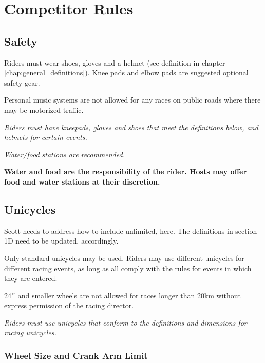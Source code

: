 \chapter{Competitor Rules}

\section{Safety}
Riders must wear shoes, gloves and a helmet (see definition in chapter \ref{chap:general_definitions}).
Knee pads and elbow pads are suggested optional safety gear.

Personal music systems are not allowed for any races on public roads where there may be motorized traffic.

\textit{Riders must have kneepads, gloves and shoes that meet the definitions below, and helmets for certain events.}

\textit{Water/food stations are recommended.}

\textbf{Water and food are the responsibility of the rider. Hosts may offer food and water stations at their discretion.}

\section{Unicycles}

\begin{framed}
Scott needs to address how to include unlimited, here. The definitions in section 1D need to be updated, accordingly.

\end{framed}

Only standard unicycles may be used.
Riders may use different unicycles for different racing events, as long as all comply with the rules for events in which they are entered.

24$"$ and smaller wheels are not allowed for races longer than 20km without express permission of the racing director.

\textit{Riders must use unicycles that conform to the definitions and dimensions for racing unicycles.}

\subsection{Wheel Size and Crank Arm Limit}



